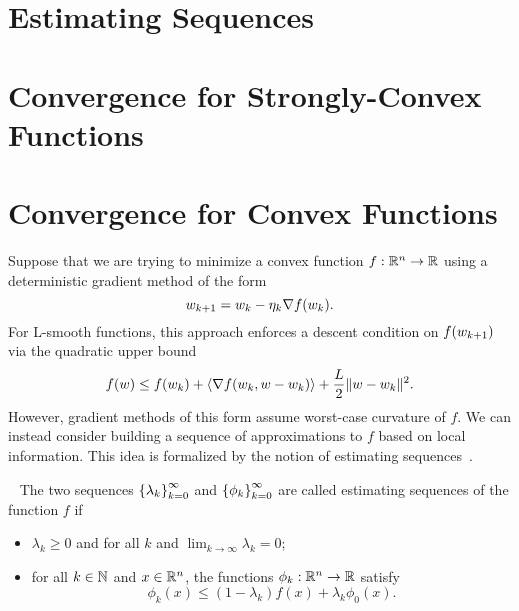 \section{Estimating Sequences}\label{sec:estimating-sequences}

\section{Convergence for Strongly-Convex Functions}\label{sec:agd-sc}

\section{Convergence for Convex Functions}\label{sec:agd-convex}


Suppose that we are trying to minimize a convex function \( f : \mathbb{R}^n \rightarrow \mathbb{R} \) using a deterministic gradient method of the form
\[ w_{k+1} = w_k - \eta_k \nabla f(w_k). \]
For L-smooth functions, this approach enforces a descent condition on \( f(w_{k+1}) \) via the quadratic upper bound
\[ f(w) \leq f(w_k) + \left\langle\nabla f(w_k, w - w_k)\right\rangle + \frac{L}{2}\|w - w_k\|^2. \]
However, gradient methods of this form assume worst-case curvature of \( f \).
We can instead consider building a sequence of approximations to \( f \) based on local information.
This idea is formalized by the notion of estimating sequences~\citep{nesterov2004lectures}.\\

\begin{definition}~\label{def:estimating_sequences}
    The two sequences \( \left\{\lambda_k\right\}_{k=0}^\infty \) and \( \left\{\phi_k\right\}_{k=0}^\infty \) are called estimating sequences of the function \( f \) if
    \begin{itemize}
        \item \( \lambda_k \geq 0 \) and for all \( k \) and \( \lim_{k\rightarrow \infty} \lambda_k = 0 \);
        \item for all \( k \in \mathbb{N} \) and \( x \in \mathbb{R}^n \), the functions \( \phi_k: \mathbb{R}^n \rightarrow \mathbb{R} \) satisfy
        \[ \phi_k(x) \leq (1 - \lambda_k) f(x) + \lambda_k \phi_0(x). \]
    \end{itemize}
\end{definition}

